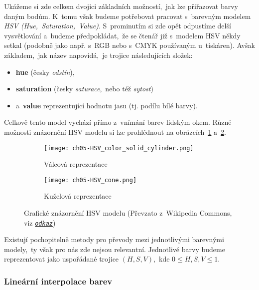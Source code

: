 Ukážeme si zde celkem dvojici základních možností,~jak lze přiřazovat barvy daným bodům. K~tomu však budeme potřebovat pracovat s~barevným modelem \emph{HSV (Hue,~Saturation,~Value)}. S~prominutím si zde opět odpustíme delší vysvětlování a~budeme předpokládat,~že se čtenář již s~modelem HSV někdy setkal (podobně jako např. s~RGB nebo s~CMYK používaným u~tiskáren). Avšak základem,~jak název napovídá,~je trojice následujících složek:
\begin{itemize}
    \item \textbf{hue} (česky \emph{odstín}),
    \item \textbf{saturation} (česky \emph{saturace},~nebo též \emph{sytost})
    \item a~\textbf{value} reprezentující hodnotu jasu (tj. podílu bílé barvy).
\end{itemize}
Celkově tento model vychází přímo z~vnímání barev lidským okem. Různé možnosti znázornění HSV modelu si lze prohlédnout na obrázcích~\ref{subfig:hsv-valcova-reprezentace} a~\ref{subfig:hsv-kuzelova-reprezentace}.
\begin{figure}[h]
    \centering
    \begin{subfigure}{0.45\textwidth}
        \centering
        \texttt{[image: ch05-HSV\_color\_solid\_cylinder.png]}
        \caption{Válcová reprezentace}
        \label{subfig:hsv-valcova-reprezentace}
    \end{subfigure}
    \qquad
    \begin{subfigure}{0.45\textwidth}
        \centering
        \texttt{[image: ch05-HSV\_cone.png]}
        \caption{Kuželová reprezentace}
        \label{subfig:hsv-kuzelova-reprezentace}
    \end{subfigure}
    \caption[Grafické znázornění HSV modelu]{Grafické znázornění HSV modelu (Převzato z~Wikipedia Commons, viz \href{https://cs.wikipedia.org/wiki/HSV}{\texttt{\textit{odkaz}}})}
    \label{fig:hsv}
\end{figure}

Existují pochopitelně metody pro převody mezi jednotlivými barevnými modely,~ty však pro nás zde nejsou relevantní. Jednotlivé barvy budeme reprezentovat jako uspořádané trojice $(H,S,V)$,~kde $0\leqslant H,S,V\leqslant 1$.

\subsubsection{Lineární interpolace barev}

